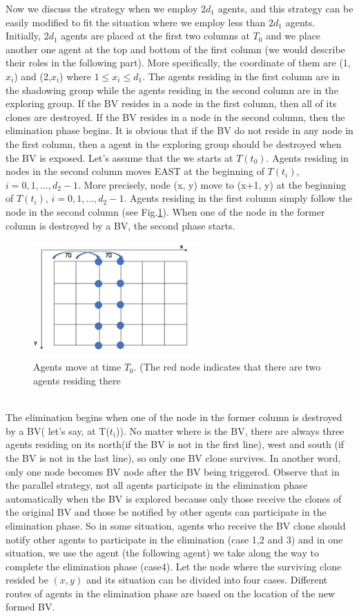 Now we discuss the strategy when we employ $2d_1$ agents, and this strategy can be easily modified to fit the situation where we employ less than $2d_1$ agents.\\
Initially, 2$d_1$ agents are placed at the first two columns at $T_0$ and we place another one agent at the top and bottom of the first column (we would describe their roles in the following part). More specifically, the coordinate of them are (1, $x_i$) and (2,$x_i$) where $1\leq x_i\leq d_1$. The agents residing in the first column are in the shadowing group while the agents residing in the second column are in the exploring group. If the BV resides in a node in the first column, then all of its clones are destroyed. If the BV resides in a node in the second column, then the elimination phase begins. It is obvious that if the BV do not reside in any node in the first column, then a agent in the exploring group should be destroyed when the BV is exposed.  Let's assume that the we starts at $T(t_0)$. Agents residing in nodes in the second column moves EAST at the beginning of $T(t_i)$, $i=0,1, \ldots ,d_2-1$. More precisely, node (x, y) move to (x+1, y) at the beginning of $T(t_i)$, $i=0,1, \dots , d_2-1$. Agents residing in the first column simply follow the node in the second column (see  Fig.\ref{fig:TShE}). When one of the node in the former column is destroyed by a BV, the second phase starts.
\begin{figure}[H]
  \centering  
  \includegraphics[width=2.5in]{figures/TShE.png}
  \caption{Agents move at time $T_0$. (The red node indicates that there are two agents residing there}\label{fig:TShE}
\end{figure}
\\
The elimination begins when one of the node in the former column is destroyed by a BV( let's say, at T($t_i$)). No matter where is the BV, there are always three agents residing on its north(if the BV is not in the first line), west and south (if the BV is not in the last line), so only one BV clone survives. In another word, only one node becomes BV node after the BV being triggered. Observe that in the parallel strategy, not all agents participate in the elimination phase automatically when the BV is explored because only those receive the clones of the original BV and those be notified by other agents can participate in the elimination phase. So in some situation, agents who receive the BV clone should notify other agents to participate in the elimination (case 1,2 and 3) and in one situation, we use the agent (the following agent) we take along the way to complete the elimination phase (case4). Let the node where the surviving clone resided be $(x, y)$ and its situation can be divided into four cases. Different routes of agents in the elimination phase are based on the location of the new formed BV.
